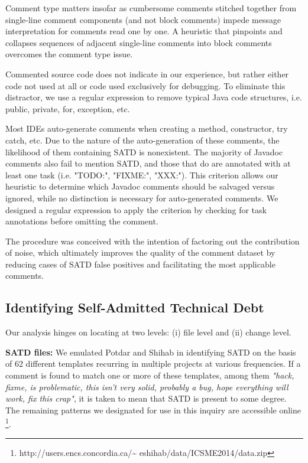 Comment type matters insofar as cumbersome comments stitched together from single-line comment components (and not block comments) impede message interpretation for comments read one by one. A heuristic that pinpoints and collapses sequences of adjacent single-line comments into block comments overcomes the comment type issue.\par



Commented source code does not indicate \SATD in our experience, but rather either code not used at all or code used exclusively for debugging. To eliminate this distractor, we use a regular expression to remove typical Java code structures, i.e. public, private, for, exception, etc.\par


Most IDEs auto-generate comments when creating a method, constructor, try catch, etc. Due to the nature of the auto-generation of these comments, the likelihood of them containing SATD is nonexistent. The majority of Javadoc comments also fail to mention SATD, and those that do are annotated with at least one task (i.e. "TODO:", "FIXME:", "XXX:"). This criterion allows our heuristic to determine which Javadoc comments should be salvaged versus ignored, while no distinction is necessary for auto-generated comments. We designed a regular expression to apply the criterion by checking for task annotations before omitting the comment.\par




The procedure was conceived with the intention of factoring out the contribution of noise, which ultimately improves the quality of the comment dataset by reducing cases of SATD false positives and facilitating the most applicable comments.\par



\subsection{Identifying Self-Admitted Technical Debt}
\label{td}


Our analysis hinges on locating \SATD at two levels: (i) file level and (ii) change level.

\noindent\textbf{SATD files:}
We emulated Potdar and Shihab \cite{ICSM_PotdarS14} in identifying SATD on the basis of 62 different templates recurring in multiple projects at various frequencies. If a comment is found to match one or more of these templates, among them \textit{"hack, fixme, is problematic, this isn't very solid, probably a bug, hope everything will work, fix this crap"}, it is taken to mean that SATD is present to some degree. The remaining patterns we designated for use in this inquiry are accessible online \footnote{http://users.encs.concordia.ca/\textasciitilde
eshihab/data/ICSME2014/data.zip}.


